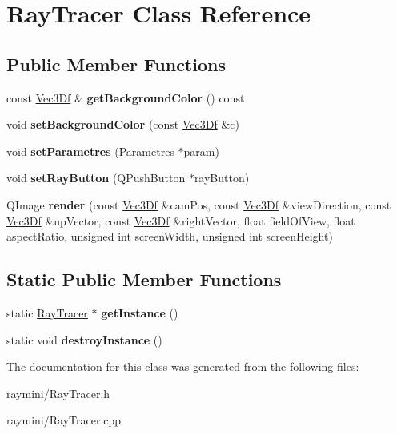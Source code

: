 \hypertarget{class_ray_tracer}{
\section{RayTracer Class Reference}
\label{class_ray_tracer}
}
\subsection*{Public Member Functions}
\begin{DoxyCompactItemize}
\item 
\hypertarget{class_ray_tracer_a8232047f622bcad4c4bcc2e9b3f994e8}{
const \hyperlink{class_vec3_d}{Vec3Df} \& {\bfseries getBackgroundColor} () const }
\label{class_ray_tracer_a8232047f622bcad4c4bcc2e9b3f994e8}

\item 
\hypertarget{class_ray_tracer_a78c48fc5448e6fdbaaa2dacc00c1f52d}{
void {\bfseries setBackgroundColor} (const \hyperlink{class_vec3_d}{Vec3Df} \&c)}
\label{class_ray_tracer_a78c48fc5448e6fdbaaa2dacc00c1f52d}

\item 
\hypertarget{class_ray_tracer_a7fb36466bbdc06e9084c2af6393e71f6}{
void {\bfseries setParametres} (\hyperlink{class_parametres}{Parametres} $\ast$param)}
\label{class_ray_tracer_a7fb36466bbdc06e9084c2af6393e71f6}

\item 
\hypertarget{class_ray_tracer_a0fefb72c52244a0b4785d4dc595b6a04}{
void {\bfseries setRayButton} (QPushButton $\ast$rayButton)}
\label{class_ray_tracer_a0fefb72c52244a0b4785d4dc595b6a04}

\item 
\hypertarget{class_ray_tracer_a514cb132e6f69be5658c5afb5651809b}{
QImage {\bfseries render} (const \hyperlink{class_vec3_d}{Vec3Df} \&camPos, const \hyperlink{class_vec3_d}{Vec3Df} \&viewDirection, const \hyperlink{class_vec3_d}{Vec3Df} \&upVector, const \hyperlink{class_vec3_d}{Vec3Df} \&rightVector, float fieldOfView, float aspectRatio, unsigned int screenWidth, unsigned int screenHeight)}
\label{class_ray_tracer_a514cb132e6f69be5658c5afb5651809b}

\end{DoxyCompactItemize}
\subsection*{Static Public Member Functions}
\begin{DoxyCompactItemize}
\item 
\hypertarget{class_ray_tracer_af849b82f2b2c0cfe5a29e1f63c91aa8b}{
static \hyperlink{class_ray_tracer}{RayTracer} $\ast$ {\bfseries getInstance} ()}
\label{class_ray_tracer_af849b82f2b2c0cfe5a29e1f63c91aa8b}

\item 
\hypertarget{class_ray_tracer_a18c26a7f9a11ddef3af7dc9431fa240b}{
static void {\bfseries destroyInstance} ()}
\label{class_ray_tracer_a18c26a7f9a11ddef3af7dc9431fa240b}

\end{DoxyCompactItemize}


The documentation for this class was generated from the following files:\begin{DoxyCompactItemize}
\item 
raymini/RayTracer.h\item 
raymini/RayTracer.cpp\end{DoxyCompactItemize}
